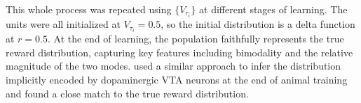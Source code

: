 \begin{figure*}[!t]
{        This whole process was repeated using $\{V_{\tau_i}\}$ at different stages of learning.
        The units were all initialized at $V_{\tau_i} = 0.5$, so the initial distribution is a delta function at $r = 0.5$.
        At the end of learning, the population faithfully represents the true reward distribution, capturing key features including bimodality and the relative magnitude of the two modes.
        \citet{dabney2020distributional} used a similar approach to infer the distribution implicitly encoded by dopaminergic VTA neurons at the end of animal training and found a close match to the true reward distribution.
        }
    \vspace*{-1.0em}
\end{figure*}

